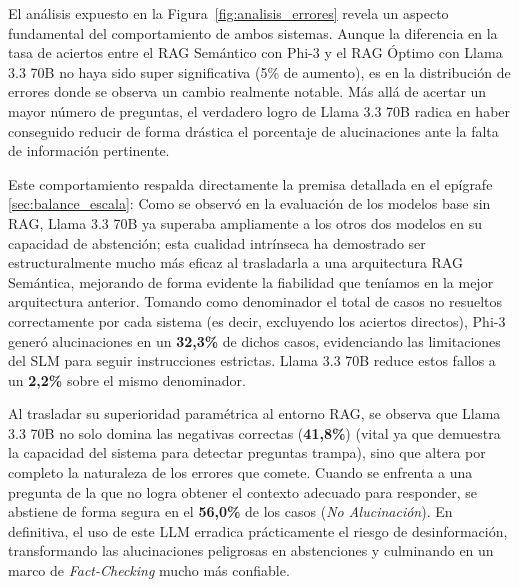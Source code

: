 El análisis expuesto en la Figura~\ref{fig:analisis_errores} revela un aspecto fundamental del comportamiento de ambos sistemas. Aunque la diferencia en la tasa de aciertos entre el RAG Semántico con Phi-3 y el RAG Óptimo con Llama 3.3 70B no haya sido super significativa (5\% de aumento), es en la distribución de errores donde se observa un cambio realmente notable. Más allá de acertar un mayor número de preguntas, el verdadero logro de Llama 3.3 70B radica en haber conseguido reducir de forma drástica el porcentaje de alucinaciones ante la falta de información pertinente.

Este comportamiento respalda directamente la premisa detallada en el epígrafe \ref{sec:balance_escala}: Como se observó en la evaluación de los modelos base sin RAG, Llama 3.3 70B ya superaba ampliamente a los otros dos modelos en su capacidad de abstención; esta cualidad intrínseca ha demostrado ser estructuralmente mucho más eficaz al trasladarla a una arquitectura RAG Semántica, mejorando de forma evidente la fiabilidad que teníamos en la mejor arquitectura anterior. Tomando como denominador el total de casos no resueltos correctamente por cada sistema (es decir, excluyendo los aciertos directos), Phi-3 generó alucinaciones en un \textbf{32,3\%} de dichos casos, evidenciando las limitaciones del SLM para seguir instrucciones estrictas. Llama 3.3 70B reduce estos fallos a un \textbf{2,2\%} sobre el mismo denominador.

Al trasladar su superioridad paramétrica al entorno RAG, se observa que Llama 3.3 70B no solo domina las negativas correctas (\textbf{41,8\%}) (vital ya que demuestra la capacidad del sistema para detectar preguntas trampa), sino que altera por completo la naturaleza de los errores que comete. Cuando se enfrenta a una pregunta de la que no logra obtener el contexto adecuado para responder, se abstiene de forma segura en el \textbf{56,0\%} de los casos (\textit{No Alucinación}). En definitiva, el uso de este LLM erradica prácticamente el riesgo de desinformación, transformando las alucinaciones peligrosas en abstenciones y culminando en un marco de \textit{Fact-Checking} mucho más confiable.

